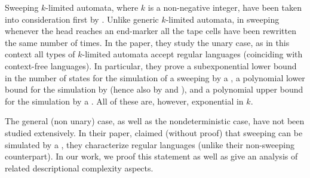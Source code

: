 Sweeping $k$-limited automata, where $k$ is a non-negative integer, have been taken into consideration first by \citeauthor{KutPig+18} \cite{KutPig+18}.
Unlike generic $k$-limited automata, in sweeping \kLA whenever the head reaches an end-marker all the tape cells have been rewritten the same number of times.
In the paper, they study the unary case, as in this context all types of $k$-limited automata accept regular languages (coinciding with context-free languages).
In particular, they prove a subexponential lower bound in the number of states for the simulation of a sweeping \kDLA by a \ODFA, a polynomial lower bound for the simulation by \TNFA (hence also by \TDFA and \ONFA), and a polynomial upper bound for the simulation by a \TDFA.
All of these are, however, exponential in $k$.

The general (non unary) case, as well as the nondeterministic case, have not been studied extensively.
In their paper, \citeauthor{KutPig+18} claimed (without proof) that sweeping \kLAs can be simulated by a \ONFA, \ie they characterize regular languages (unlike their non-sweeping counterpart).
In our work, we proof this statement as well as give an analysis of related descriptional complexity aspects.
